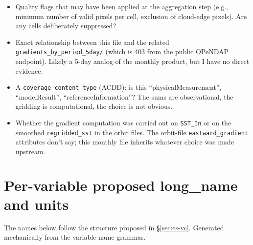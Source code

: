 \documentclass[11pt]{article}
\begin{document}
\begin{itemize}
  \item Quality flags that may have been applied at the
    aggregation step (e.g., minimum number of valid pixels per
    cell, exclusion of cloud-edge pixels). Are any cells
    deliberately suppressed?
  \item Exact relationship between this file and the related
    \texttt{gradients\_by\_period\_5day/} (which is 403 from the
    public OPeNDAP endpoint). Likely a 5-day analog of the
    monthly product, but I have no direct evidence.
  \item A \texttt{coverage\_content\_type} (ACDD): is this
    ``physicalMeasurement'', ``modelResult'',
    ``referenceInformation''? The sums are observational, the
    gridding is computational, the choice is not obvious.
  \item Whether the gradient computation was carried out on
    \texttt{SST\_In} or on the smoothed \texttt{regridded\_sst}
    in the orbit files. The orbit-file
    \texttt{eastward\_gradient} attributes don't say; this
    monthly file inherits whatever choice was made upstream.
\end{itemize}

\section{Per-variable proposed long\_name and units}\label{sec:longnames}

The names below follow the structure proposed in
\S\ref{sec:es-vc}. Generated mechanically from the variable name
grammar.
\end{document}
